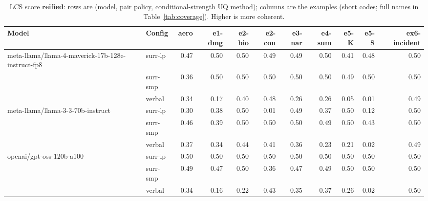 \documentclass[11pt]{article}
\begin{document}
\begin{table}[htbp]
\centering
\footnotesize
\setlength{\tabcolsep}{3.5pt}
\caption{LCS score \textbf{reified}: rows are (model, pair policy, conditional-strength UQ method); columns are the examples (short codes; full names in Table~\ref{tab:coverage}). Higher is more coherent.}
\label{tab:reified}
\begin{tabular}{llrrrrrrrrr}
\toprule
\textbf{Model} & \textbf{Config} & \textbf{aero} & \textbf{e1-dmg} & \textbf{e2-bio} & \textbf{e2-con} & \textbf{e3-nar} & \textbf{e4-sum} & \textbf{e5-K} & \textbf{e5-S} & \textbf{ex6-incident} \\
\midrule
meta-llama/llama-4-maverick-17b-128e-instruct-fp8 & surr-lp & 0.47 & 0.50 & 0.50 & 0.49 & 0.49 & 0.50 & 0.41 & 0.48 & 0.50 \\
 & surr-smp & 0.36 & 0.50 & 0.50 & 0.50 & 0.50 & 0.50 & 0.49 & 0.50 & 0.50 \\
 & verbal & 0.34 & 0.17 & 0.40 & 0.48 & 0.26 & 0.26 & 0.05 & 0.01 & 0.49 \\
\midrule
meta-llama/llama-3-3-70b-instruct & surr-lp & 0.30 & 0.38 & 0.50 & 0.01 & 0.49 & 0.37 & 0.50 & 0.12 & 0.50 \\
 & surr-smp & 0.46 & 0.39 & 0.50 & 0.50 & 0.50 & 0.49 & 0.50 & 0.43 & 0.50 \\
 & verbal & 0.37 & 0.34 & 0.44 & 0.41 & 0.36 & 0.23 & 0.21 & 0.02 & 0.49 \\
\midrule
openai/gpt-oss-120b-a100 & surr-lp & 0.50 & 0.50 & 0.50 & 0.50 & 0.50 & 0.50 & 0.50 & 0.50 & 0.50 \\
 & surr-smp & 0.49 & 0.47 & 0.50 & 0.36 & 0.47 & 0.49 & 0.50 & 0.50 & 0.50 \\
 & verbal & 0.34 & 0.16 & 0.22 & 0.43 & 0.35 & 0.37 & 0.26 & 0.02 & 0.50 \\
\bottomrule
\end{tabular}
\end{table}
\end{document}
